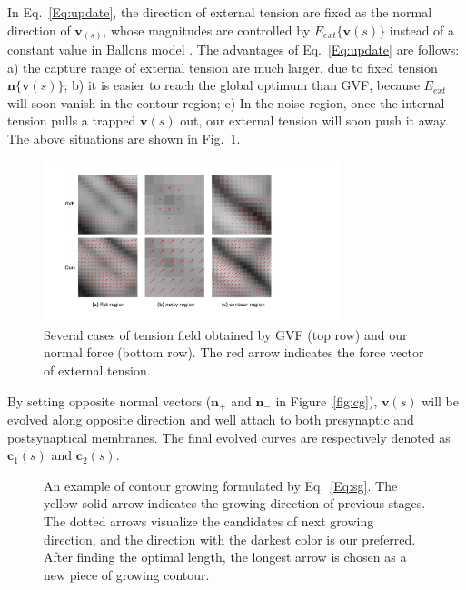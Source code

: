 In Eq.~\ref{Eq:update}, the direction of external tension are fixed as the normal direction of $\mathbf{v}_(s)$, whose magnitudes are controlled by $E_{ext}\{\mathbf{v}(s)\}$ instead of a constant value in Ballons model \cite{Cohen1991}.
The advantages of Eq.~\ref{Eq:update} are follows:
a) the capture range of external tension are much larger, due to fixed tension $\mathbf{n}\{\mathbf{v}(s)\}$;
b) it is easier to reach the global optimum than GVF, because $E_{ext}$ will soon vanish in the contour region;
c) In the noise region, once the internal tension pulls a trapped $\mathbf{v}(s)$ out, our external tension will soon push it away.
The above situations are shown in Fig.~\ref{fig:gvf}.



\begin{figure}[t]
	\begin{center}
		\includegraphics[width=3.4in]{figs/FigGVF.pdf}
	\end{center}
	\caption{Several cases of tension field obtained by GVF (top row) and our normal force (bottom row). The red arrow indicates the force vector of external tension.}
	\label{fig:gvf}
\end{figure}



By setting opposite normal vectors ($\mathbf{n}_{+}$ and $\mathbf{n}_{-}$ in Figure~\ref{fig:cg}), $\mathbf{v}(s)$ will be evolved along opposite direction and well attach to both presynaptic and postsynaptical membranes.
The final evolved curves are respectively denoted as $\mathbf{c}_1(s)$ and $\mathbf{c}_2(s)$.

\begin{figure}[t]
\begin{minipage}[b]{1.0\linewidth}
  \centering
 \centerline{}
\end{minipage}
\caption{An example of contour growing formulated by Eq.~\ref{Eq:sg}.
        The yellow solid arrow indicates the growing direction of previous stages.
        The dotted arrows visualize the candidates of next growing direction, and the direction with the darkest color is our preferred.
        After finding the optimal length, the longest arrow is chosen as a new piece of growing contour.}
\label{fig:g}
\end{figure}

